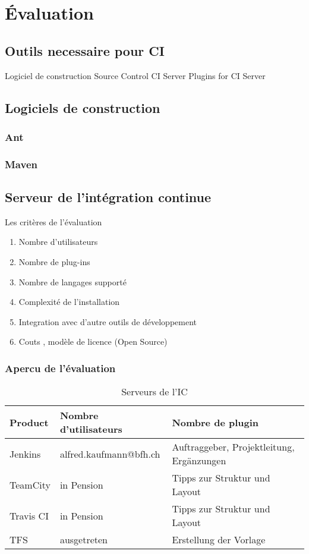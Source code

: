 \chapter{Évaluation}
\label{eval}

\section{Outils necessaire pour CI}

Logiciel de construction
Source Control
CI Server
Plugins for CI Server

\section{Logiciels de construction}

\subsection{Ant}

\subsection{Maven}

\section{Serveur de l'intégration continue}

Les critères de l'évaluation

\begin{enumerate}
\item Nombre d'utilisateurs
\item Nombre de plug-ins
\item Nombre de langages supporté
\item Complexité de l'installation
\item Integration avec d'autre outils de développement 
\item Couts , modèle de licence (Open Source)
\end{enumerate}

\subsection{Apercu de l'évaluation}

\begin{table}[H]
	\centering
		\begin{tabular}{lll} \toprule
			\textbf{Product} & \textbf{Nombre d'utilisateurs} & \textbf{Nombre de plugin} \\ \midrule
			Jenkins & alfred.kaufmann@bfh.ch & Auftraggeber, Projektleitung, Ergänzungen \\ \midrule
			TeamCity & in Pension & Tipps zur Struktur und Layout \\ \midrule
			Travis CI & in Pension & Tipps zur Struktur und Layout \\ \midrule
			TFS & ausgetreten & Erstellung der Vorlage \\ \bottomrule
		\end{tabular}
	\caption{Serveurs de l'IC}
	\label{tab:serveurs_eval}
\end{table}

